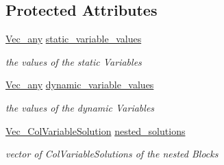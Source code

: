 \subsection*{Protected Attributes}
\begin{DoxyCompactItemize}
\item 
\mbox{\hyperlink{group___s_m_s__types_ga58ded0963812566c064a5177b2f84c28}{Vec\+\_\+any}} \mbox{\hyperlink{class_s_m_spp__di__unipi__it_1_1_col_variable_solution_a92425828d52bb80f04e3e9b01a43f41a}{static\+\_\+variable\+\_\+values}}
\begin{DoxyCompactList}\small\item\em the values of the static Variables \end{DoxyCompactList}\item 
\mbox{\hyperlink{group___s_m_s__types_ga58ded0963812566c064a5177b2f84c28}{Vec\+\_\+any}} \mbox{\hyperlink{class_s_m_spp__di__unipi__it_1_1_col_variable_solution_a02af9934be47ba5b952c09fd1f63d35f}{dynamic\+\_\+variable\+\_\+values}}
\begin{DoxyCompactList}\small\item\em the values of the dynamic Variables \end{DoxyCompactList}\item 
\mbox{\label{class_s_m_spp__di__unipi__it_1_1_col_variable_solution_a7f09a60c24c0f5446baa1627409fe5c1}} 
\mbox{\hyperlink{group___col_variable_solution___t_y_p_e_s_gad843ca4ba6da2f653bbc07a62a8c49dd}{Vec\+\_\+\+Col\+Variable\+Solution}} \mbox{\hyperlink{class_s_m_spp__di__unipi__it_1_1_col_variable_solution_a7f09a60c24c0f5446baa1627409fe5c1}{nested\+\_\+solutions}}
\begin{DoxyCompactList}\small\item\em vector of Col\+Variable\+Solutions of the nested Blocks \end{DoxyCompactList}\end{DoxyCompactItemize}
